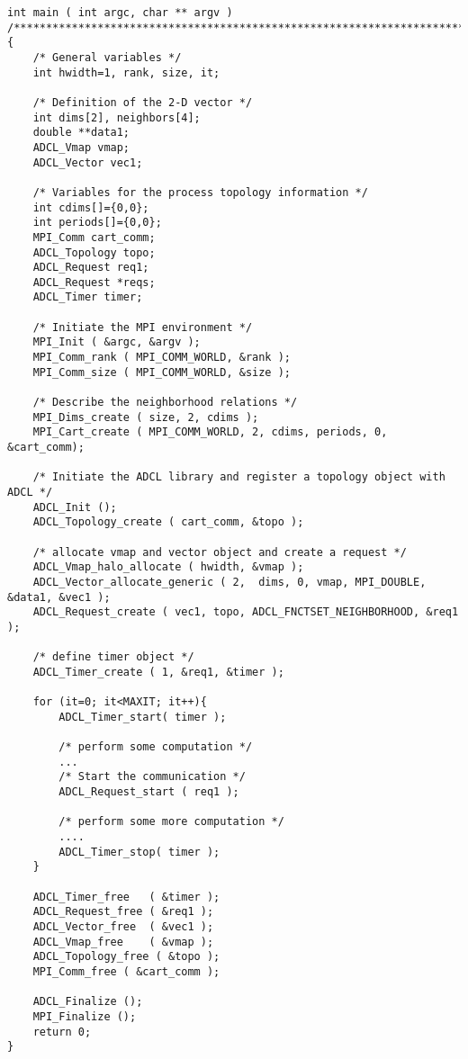 \begin{verbatim}
int main ( int argc, char ** argv ) 
/**********************************************************************/
{
    /* General variables */
    int hwidth=1, rank, size, it;
    
    /* Definition of the 2-D vector */
    int dims[2], neighbors[4];
    double **data1;
    ADCL_Vmap vmap;
    ADCL_Vector vec1;

    /* Variables for the process topology information */
    int cdims[]={0,0};
    int periods[]={0,0};
    MPI_Comm cart_comm;
    ADCL_Topology topo;
    ADCL_Request req1;
    ADCL_Request *reqs;  
    ADCL_Timer timer;

    /* Initiate the MPI environment */
    MPI_Init ( &argc, &argv );
    MPI_Comm_rank ( MPI_COMM_WORLD, &rank );
    MPI_Comm_size ( MPI_COMM_WORLD, &size );

    /* Describe the neighborhood relations */
    MPI_Dims_create ( size, 2, cdims );
    MPI_Cart_create ( MPI_COMM_WORLD, 2, cdims, periods, 0, &cart_comm);

    /* Initiate the ADCL library and register a topology object with ADCL */
    ADCL_Init ();
    ADCL_Topology_create ( cart_comm, &topo );

    /* allocate vmap and vector object and create a request */
    ADCL_Vmap_halo_allocate ( hwidth, &vmap );
    ADCL_Vector_allocate_generic ( 2,  dims, 0, vmap, MPI_DOUBLE, &data1, &vec1 );
    ADCL_Request_create ( vec1, topo, ADCL_FNCTSET_NEIGHBORHOOD, &req1 );

    /* define timer object */
    ADCL_Timer_create ( 1, &req1, &timer );

    for (it=0; it<MAXIT; it++){
        ADCL_Timer_start( timer );

        /* perform some computation */ 
        ...       
        /* Start the communication */
        ADCL_Request_start ( req1 );

        /* perform some more computation */
        ....
        ADCL_Timer_stop( timer );
    }

    ADCL_Timer_free   ( &timer );
    ADCL_Request_free ( &req1 );
    ADCL_Vector_free  ( &vec1 );
    ADCL_Vmap_free    ( &vmap );
    ADCL_Topology_free ( &topo );
    MPI_Comm_free ( &cart_comm );
    
    ADCL_Finalize ();
    MPI_Finalize ();
    return 0;
}
\end{verbatim}
